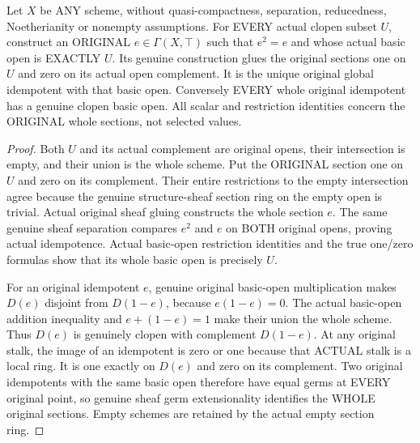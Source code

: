\begin{theorem}
\label{scheme:actual-global-idempotent-clopen-correspondence}
\leanok
{}
Let $X$ be ANY scheme, without quasi-compactness, separation, reducedness,
Noetherianity or nonempty assumptions. For EVERY actual clopen subset $U$,
construct an ORIGINAL $e\in\Gamma(X,\top)$ such that $e^2=e$ and whose
actual basic open is EXACTLY $U$. Its genuine construction glues the original sections one on $U$
and zero on its actual open complement. It is the unique original
global idempotent with that basic open. Conversely EVERY whole original
idempotent has a genuine clopen basic open. All scalar and restriction
identities concern the ORIGINAL whole sections, not selected values.
\end{theorem}
\begin{proof}
Both $U$ and its actual complement are original opens, their intersection
is empty, and their union is the whole scheme. Put the ORIGINAL section
one on $U$ and zero on its complement. Their entire restrictions to the
empty intersection agree because the genuine structure-sheaf section ring
on the empty open is trivial. Actual original sheaf gluing constructs the
whole section $e$. The same genuine sheaf separation compares $e^2$ and
$e$ on BOTH original opens, proving actual idempotence. Actual basic-open
restriction identities and the true one/zero formulas show that its whole
basic open is precisely $U$.

For an original idempotent $e$, genuine original basic-open multiplication
makes $D(e)$ disjoint from $D(1-e)$, because $e(1-e)=0$. The actual
basic-open addition inequality and $e+(1-e)=1$ make their union the whole
scheme. Thus $D(e)$ is genuinely clopen with complement $D(1-e)$.
At any original stalk, the image of an idempotent is zero or one because
that ACTUAL stalk is a local ring. It is one exactly on $D(e)$ and zero
on its complement. Two original idempotents with the same basic open
therefore have equal germs at EVERY original point, so genuine sheaf germ
extensionality identifies the WHOLE original sections. Empty schemes are
retained by the actual empty section ring.
\end{proof}

